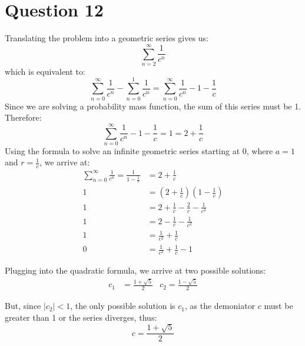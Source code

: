 \documentclass[titlepage, 12pt, leqno]{article}
\begin{document}
\pagebreak
\section{Question 12}
Translating the problem into a geometric series gives us:
\[
    \sum_{n=2}^{\infty}\frac{1}{c^n} 
\]
which is equivalent to:
\[
    \sum_{n=0}^{\infty}\frac{1}{c^n} - \sum_{n=0}^{1}\frac{1}{c^n} = \sum_{n=0}^{\infty}\frac{1}{c^n} -1-\frac{1}{c}
\]
Since we are solving a probability mass function, the sum of this series must be 1. Therefore:
\[
    \sum_{n=0}^{\infty}\frac{1}{c^n} - 1 - \frac{1}{c} = 1 = 2 + \frac{1}{c} 
\]
Using the formula to solve an infinite geometric series starting at 0, where $a = 1$ and $r = \frac{1}{c}$, we arrive at:
\begin{align*}
    \sum_{n=0}^{\infty}\frac{1}{c^n} = \frac{1}{1-\frac{1}{c}} &= 2+\frac{1}{c} \\
    1 &= \left(2+\frac{1}{c}\right)\left(1-\frac{1}{c}\right) \\
    1 &= 2 + \frac{1}{c} - \frac{2}{c} - \frac{1}{c^2} \\
    1 &= 2 - \frac{1}{c} - \frac{1}{c^2} \\
    1 &= \frac{1}{c^2} + \frac{1}{c} \\
    0 &= \frac{1}{c^2} + \frac{1}{c} - 1
\end{align*}

Plugging into the quadratic formula, we arrive at two possible solutions:
\begin{align*}
    c_1 &= \frac{1+\sqrt{5}}{2} &c_2 = \frac{1-\sqrt5}{2} 
\end{align*}

But, since $|c_2| < 1$, the only possible solution is $c_1$, as the demoniator $c$ must be greater than 1 or the series diverges, thus:
\[
\boxed{c = \frac{1+\sqrt5}{2}} 
\]
\end{document}
